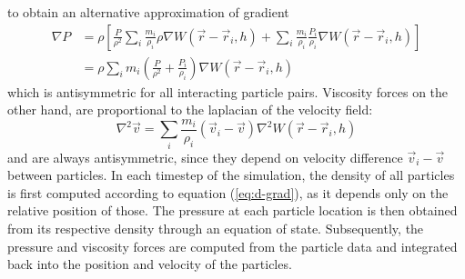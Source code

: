 \documentclass{llncs}
\begin{document}
to obtain an alternative approximation of gradient
\begin{align}
  \label{eq:grad-est}
  \nabla P & = \rho \left[ \frac{P}{\rho^2} \sum_i \frac{m_i}{\rho_i} \rho \nabla
             W(\vec{r}-\vec{r}_i, h)
             +
             \sum_i \frac{m_i}{\rho_i} \frac{P_i}{\rho_i} \nabla W(\vec{r}-\vec{r}_i, h)
             \right] \nonumber \\
           & = \rho \sum_i m_i \left(\frac{P}{\rho^2} + \frac{P_i}{\rho_i} \right)
             \nabla W(\vec{r}-\vec{r}_i, h)
\end{align}
which is antisymmetric for all interacting particle pairs. Viscosity forces on the other
hand, are proportional to the laplacian of the velocity field:
\begin{equation}
  \label{eq:lapl-est}
  \nabla^2\vec{v} = \sum_i \frac{m_i}{\rho_i} (\vec{v}_i - \vec{v}) \nabla^2
  W(\vec{r}-\vec{r}_i, h)
\end{equation}
and are always antisymmetric, since they depend on velocity difference
$\vec{v}_i - \vec{v}$ between particles.  In each timestep of the simulation, the density
of all particles is first computed according to equation (\ref{eq:d-grad}), as it depends
only on the relative position of those. The pressure at each particle location is then
obtained from its respective density through an equation of state. Subsequently, the
pressure and viscosity forces are computed from the particle data and integrated back into
the position and velocity of the particles.
\end{document}
